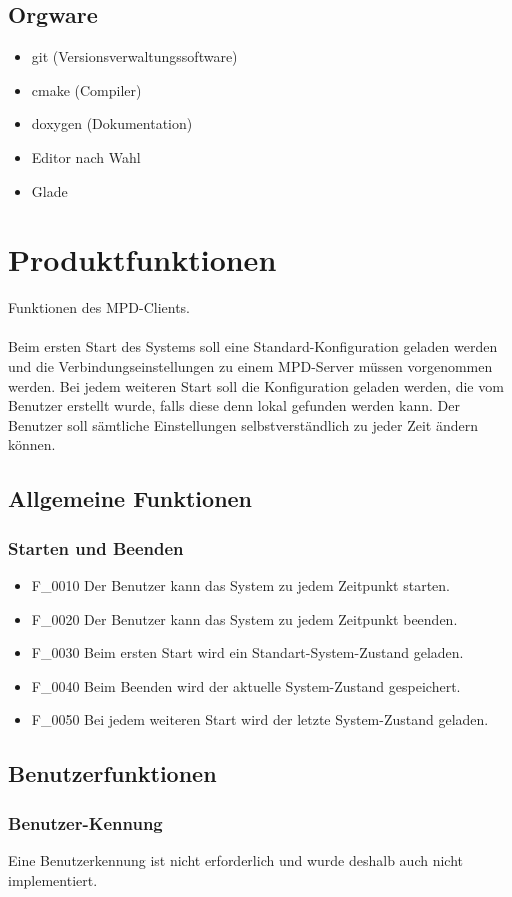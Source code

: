 \subsection{Orgware}
\begin{itemize}
	\item git (Versionsverwaltungssoftware)
	\item cmake (Compiler)
	\item doxygen (Dokumentation)
	\item Editor nach Wahl
	\item Glade
\end{itemize}
\section{Produktfunktionen}
Funktionen des MPD-Clients.\ \\ \\
Beim ersten Start des Systems soll eine Standard-Konfiguration geladen werden und die Verbindungseinstellungen
zu einem MPD-Server müssen vorgenommen werden. Bei jedem weiteren Start soll die Konfiguration geladen werden,
die vom Benutzer erstellt wurde, falls diese denn lokal gefunden werden kann. Der Benutzer soll sämtliche
Einstellungen selbstverständlich zu jeder Zeit ändern können.
\subsection{Allgemeine Funktionen}
\subsubsection{Starten und Beenden}
\begin{itemize}
	\item F\_0010 Der Benutzer kann das System zu jedem Zeitpunkt starten.
	\item F\_0020 Der Benutzer kann das System zu jedem Zeitpunkt beenden.
	\item F\_0030 Beim ersten Start wird ein Standart-System-Zustand geladen.
	\item F\_0040 Beim Beenden wird der aktuelle System-Zustand gespeichert.
	\item F\_0050 Bei jedem weiteren Start wird der letzte System-Zustand geladen.
\end{itemize}
\subsection{Benutzerfunktionen}
\subsubsection{Benutzer-Kennung}
Eine Benutzerkennung ist nicht erforderlich und wurde deshalb auch nicht implementiert.
